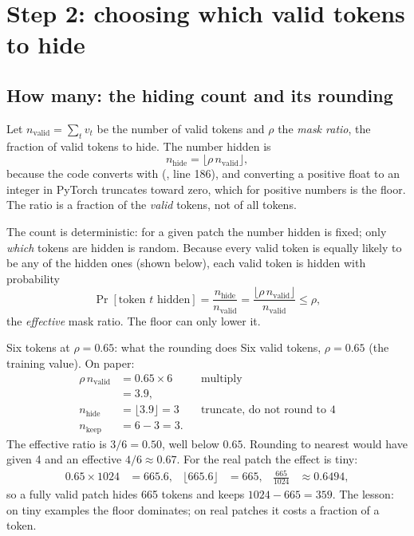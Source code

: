\section{Step 2: choosing which valid tokens to hide}\label{sec:masking:choose}

\subsection{How many: the hiding count and its rounding}

Let $n_{\text{valid}} = \sum_t v_t$ be the number of valid tokens and $\rho$ the
\emph{mask ratio}, the fraction of valid tokens to hide. The number hidden is
\begin{equation}\label{eq:masking:count}
n_{\text{hide}} = \lfloor \rho \, n_{\text{valid}} \rfloor ,
\end{equation}
because the code converts with  (, line
186), and converting a positive float to an integer in PyTorch truncates toward zero, which for
positive numbers is the floor. The ratio is a fraction of the \emph{valid} tokens, not of all tokens.

The count is deterministic: for a given patch the number hidden is fixed; only \emph{which} tokens are
hidden is random. Because every valid token is equally likely to be any of the hidden ones (shown
below), each valid token is hidden with probability
\begin{equation}\label{eq:masking:effective}
\Pr[\text{token $t$ hidden}] = \frac{n_{\text{hide}}}{n_{\text{valid}}} = \frac{\lfloor \rho\, n_{\text{valid}} \rfloor}{n_{\text{valid}}} \le \rho ,
\end{equation}
the \emph{effective} mask ratio. The floor can only lower it.

\begin{worked}[label={we:masking:rounding}]{Six tokens at \texorpdfstring{$\rho = 0.65$}{rho = 0.65}: what the rounding does}
Six valid tokens, $\rho = 0.65$ (the training value). On paper:
\begin{align*}
\rho\, n_{\text{valid}} &= 0.65 \times 6 && \text{multiply}\\
&= 3.9 ,\\
n_{\text{hide}} &= \lfloor 3.9 \rfloor = 3 && \text{truncate, do not round to 4}\\
n_{\text{keep}} &= 6 - 3 = 3 .
\end{align*}
The effective ratio is $3/6 = 0.50$, well below $0.65$. Rounding to nearest would have given 4 and an
effective $4/6 \approx 0.67$. For the real patch the effect is tiny:
\begin{align*}
0.65 \times 1024 &= 665.6, & \lfloor 665.6 \rfloor &= 665, & \frac{665}{1024} &\approx 0.6494 ,
\end{align*}
so a fully valid patch hides 665 tokens and keeps $1024 - 665 = 359$. The lesson: on tiny examples the
floor dominates; on real patches it costs a fraction of a token.
\end{worked}

